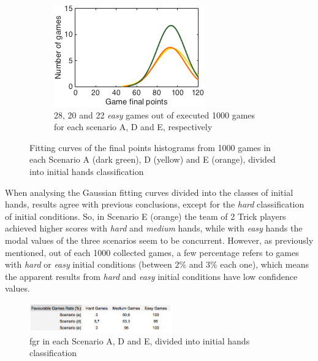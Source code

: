 \begin{figure}[h]
\begin{subfigure}[h]{0.32\textwidth}
                \includegraphics[width=\textwidth]{./img/4/ADEeasy}
                \caption{28, 20 and 22 \emph{easy} games out of executed 1000 games for each scenario A, D and E, respectively}
                \label{fig:ADEeasy}
        \end{subfigure}
        \caption{Fitting curves of the final points histograms from 1000 games in each Scenario A (dark green), D (yellow) and E (orange), divided into initial hands classification}
        \label{fig:ADE-CH}
\end{figure}

When analysing the Gaussian fitting curves divided into the classes of initial hands, results agree with previous conclusions, except for the \emph{hard} classification of initial conditions.
So, in Scenario E (orange) the team of 2 Trick players achieved higher scores with \emph{hard} and \emph{medium} hands, while with \emph{easy} hands the modal values of the three scenarios seem to be concurrent.
However, as previously mentioned, out of each 1000 collected games, a few percentage refers to games with \emph{hard} or \emph{easy} initial conditions (between 2\% and 3\% each one), which means the apparent results from \emph{hard} and \emph{easy} initial conditions have low confidence values.

\begin{figure}[h!]
  \centering
    \includegraphics[width=0.55\textwidth]{./img/4/ADE-fgr}
  \caption{\ac{fgr} in each Scenario A, D and E, divided into initial hands classification}
\label{fig:ADE-fgr}
\end{figure}

